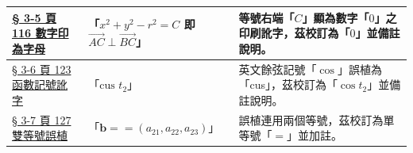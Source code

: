 \documentclass[a4paper,12pt,twoside]{article}
\begin{document}
\begin{table}[H]
\begin{tabularx}{\textwidth}{|p{3.0cm}|p{3.8cm}|X|}
\hyperref[note:b3-ch3-p116-ac-bc-zero]{§ 3-5 頁 116 數字印為字母} & 
「$x^2+y^2-r^2 = C$ 即 $\vec{AC}\perp\vec{BC}$」 & 
等號右端「$C$」顯為數字「$0$」之印刷訛字，茲校訂為「$0$」並備註說明。 \\ \hline

\hyperref[note:b3-ch3-p123-cust2-typo]{§ 3-6 頁 123 函數記號訛字} & 
「$\text{cus } t_2$」 & 
英文餘弦記號「$\cos$」誤植為「cus」，茲校訂為「$\cos t_2$」並備註說明。 \\ \hline

\hyperref[note:b3-ch3-p127-double-eq]{§ 3-7 頁 127 雙等號誤植} & 
「$\mathbf{b} == (a_{21}, a_{22}, a_{23})$」 & 
誤植連用兩個等號，茲校訂為單等號「$=$」並加註。 \\ \hline

\end{tabularx}
\end{table}
\end{document}
